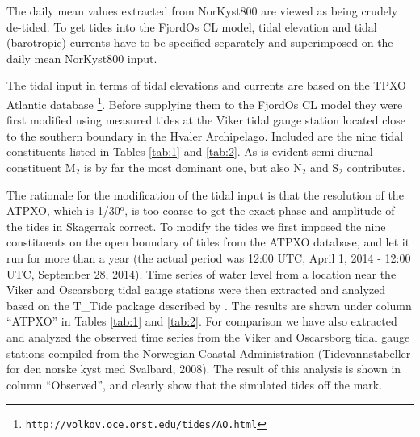 The daily mean values extracted from NorKyst800 are viewed as being crudely de-tided. To get tides into the FjordOs CL model, tidal elevation and tidal (barotropic) currents have to be specified separately and superimposed on the daily mean NorKyst800 input. 


The tidal input in terms of tidal elevations and currents are based on the TPXO Atlantic database \citep[][hereafter ATPXO]{egber:erofe:2002}\footnote{\texttt{http://volkov.oce.orst.edu/tides/AO.html}}. Before supplying them to the FjordOs CL model they were first modified using measured tides at the Viker tidal gauge station located close to the southern boundary in the Hvaler Archipelago. Included are the nine tidal constituents listed in Tables \ref{tab:1} and \ref{tab:2}. As is evident semi-diurnal constituent M$_2$ is by far the most dominant one, but also N$_2$ and S$_2$ contributes. 


The rationale for the modification of the tidal input is that the resolution of the ATPXO, which is 1/30$^{\textrm{o}}$, is too coarse to get the exact phase and amplitude of the tides in Skagerrak correct. To modify the tides we first imposed the nine constituents on the open boundary of tides from the ATPXO database, and let it run for more than a year (the actual period was 12:00 UTC, April 1, 2014 - 12:00 UTC, September 28, 2014). Time series of water level from a location near the Viker and Oscarsborg tidal gauge stations were then extracted and analyzed based on the T\_Tide package described by \cite{pavlo:etal:2002}. The results are shown under column ``ATPXO'' in Tables \ref{tab:1} and \ref{tab:2}. For comparison we have also extracted and analyzed the observed time series from the Viker and Oscarsborg tidal gauge stations compiled from the Norwegian Coastal Administration (Tidevannstabeller for den norske kyst med Svalbard, 2008). The result of this analysis is shown in column ``Observed'', and clearly show that the simulated tides off the mark.  

